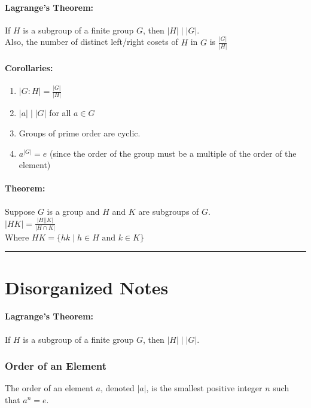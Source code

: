 \documentclass[11pt, letterpaper]{article}
\newcommand{\ord}[1]{\lvert{#1}\rvert}
\newcommand{\ordiv}[2]{\ord{{#1}} \mid \ord{{#2}}}
\begin{document}
		\paragraph{Lagrange's Theorem: }
			If $H$ is a subgroup of a finite group $G$, then $\ordiv{H}{G}$. \\
			Also, the number of distinct left/right cosets of $H$ in $G$ is $\frac{\ord{G}}{\ord{H}}$

		\paragraph{Corollaries:}
			\begin{enumerate}
				\item $\ord{G:H} = \frac{\ord{G}}{\ord{H}}$
				\item $ \ordiv{a}{G} $ for all $a \in G$
				\item Groups of prime order are cyclic.
				\item $a^{\ord{G}} = e$ (since the order of the group must be a multiple of the order of the element)
			\end{enumerate}

		\paragraph{Theorem: }
			Suppose $G$ is a group and $H$ and $K$ are subgroups of $G$.\\
			$\ord{HK} = \displaystyle\frac{\ord{H}\ord{K}}{\ord{H \cap K}}$ \\
			Where $HK = \{ hk \mid h \in H \text{ and } k \in K \}$








\clearpage
\hrule

\section{Disorganized Notes}



\paragraph{Lagrange's Theorem: }
	If $H$ is a subgroup of a finite group $G$, then $\ordiv{H}{G}$.

\subsubsection{Order of an Element}
	The order of an element $a$, denoted $\ord{a}$, is the smallest positive integer $n$ such that $a^n = e$.
\end{document}
